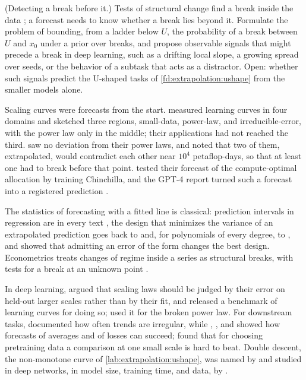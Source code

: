 \begin{refsection}
\begin{exercises}
\item \research (Detecting a break before it.) Tests of structural change find a break inside the data \parencite{Andrews1993}; a forecast needs to know whether a break lies beyond it. Formulate the problem of bounding, from a ladder below $U$, the probability of a break between $U$ and $x_0$ under a prior over breaks, and propose observable signals that might precede a break in deep learning, such as a drifting local slope, a growing spread over seeds, or the behavior of a subtask that acts as a distractor. Open: whether such signals predict the U-shaped tasks of \cref{fd:extrapolation:ushape} from the smaller models alone.\label{ex:extrapolation:research}
\end{exercises}

\notesandrefs
Scaling curves were forecasts from the start. \Textcite{HestnessEtAl2017} measured learning curves in four domains and sketched three regions, small-data, power-law, and irreducible-error, with the power law only in the middle; their applications had not reached the third. \Textcite{KaplanEtAl2020} saw no deviation from their power laws, and noted that two of them, extrapolated, would contradict each other near $10^4$ petaflop-days, so that at least one had to break before that point. \Textcite{HoffmannEtAl2022} tested their forecast of the compute-optimal allocation by training Chinchilla, and the GPT-4 report turned such a forecast into a registered prediction \parencite{OpenAI2023}.

The statistics of forecasting with a fitted line is classical: prediction intervals in regression are in every text \parencite{SeberLee2003}, the design that minimizes the variance of an extrapolated prediction goes back to \textcite{Elfving1952} and, for polynomials of every degree, to \textcite{HoelLevine1964}, and \textcite{BoxDraper1959} showed that admitting an error of the form changes the best design. Econometrics treats changes of regime inside a series as structural breaks, with tests for a break at an unknown point \parencite{Andrews1993}.

In deep learning, \textcite{AlabdulmohsinNeyshaburZhai2022} argued that scaling laws should be judged by their error on held-out larger scales rather than by their fit, and released a benchmark of learning curves for doing so; \textcite{CaballeroEtAl2023} used it for the broken power law. For downstream tasks, \textcite{LourieHuCho2025} documented how often trends are irregular, while \textcite{GadreEtAl2025}, \textcite{BhagiaEtAl2025}, and \textcite{RuanMaddisonHashimoto2024} showed how forecasts of averages and of losses can succeed; \textcite{MagnussonEtAl2025} found that for choosing pretraining data a comparison at one small scale is hard to beat. Double descent, the non-monotone curve of \cref{lab:extrapolation:ushape}, was named by \textcite{BelkinEtAl2019} and studied in deep networks, in model size, training time, and data, by \textcite{NakkiranEtAl2020}.


\end{refsection}
